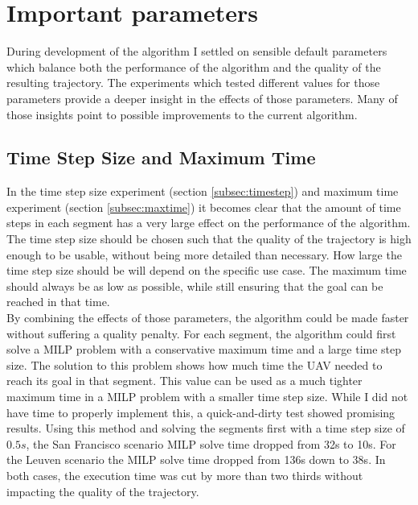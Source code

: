 \section{Important parameters}
\label{section:imp-params}
During development of the algorithm I settled on sensible default parameters which balance both the performance of the algorithm and the quality of the resulting trajectory. The experiments which tested different values for those parameters provide a deeper insight in the effects of those parameters. Many of those insights point to possible improvements to the current algorithm.

\subsection{Time Step Size and Maximum Time}
In the time step size experiment (section \ref{subsec:timestep}) and maximum time experiment (section \ref{subsec:maxtime}) it becomes clear that the amount of time steps in each segment has a very large effect on the performance of the algorithm. The time step size should be chosen such that the quality of the trajectory is high enough to be usable, without being more detailed than necessary. How large the time step size should be will depend on the specific use case. The maximum time should always be as low as possible, while still ensuring that the goal can be reached in that time. \\
By combining the effects of those parameters, the algorithm could be made faster without suffering a quality penalty. For each  segment, the algorithm could first solve a MILP problem with a conservative maximum time and a large time step size. The solution to this problem shows how much time the UAV needed to reach its goal in that segment. This value can be used as a much tighter maximum time in a MILP problem with a smaller time step size. While I did not have time to properly implement this, a quick-and-dirty test showed promising results.  Using this method and solving the segments first with a time step size of $0.5s$, the San Francisco scenario MILP solve time dropped from 32s to 10s. For the Leuven scenario the MILP solve time dropped from  136s down to 38s. In both cases, the execution time was cut by more than two thirds without impacting the quality of the trajectory.
